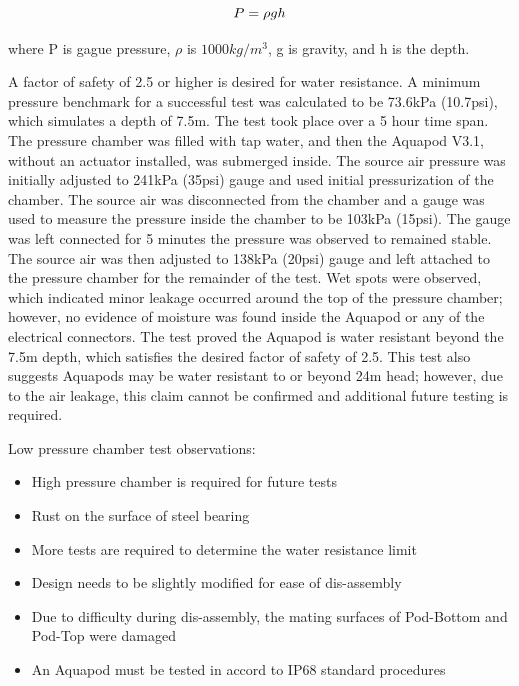 \begin{equation}\label{eq:head}
    P = \rho g h \\
\end{equation}

\noindent where P is gague pressure, $\rho$ is $1000 kg/m^3$, g is gravity, and h is the depth.

A factor of safety of 2.5 or higher is desired for water resistance. A minimum pressure benchmark for a successful test was calculated to be 73.6kPa (10.7psi), which simulates a depth of 7.5m.
The test took place over a 5 hour time span.
The pressure chamber was filled with tap water, and then the Aquapod V3.1, without an actuator installed, was submerged inside.
The source air pressure was initially adjusted to 241kPa (35psi) gauge and used initial pressurization of the chamber.
The source air was disconnected from the chamber and a gauge was used to measure the pressure inside the chamber to be 103kPa (15psi). 
The gauge was left connected for 5 minutes the pressure was observed to remained stable. 
The source air was then adjusted to 138kPa (20psi) gauge and left attached to the pressure chamber for the remainder of the test. 
Wet spots were observed, which indicated minor leakage occurred around the top of the pressure chamber; however, no evidence of moisture was found inside the Aquapod or any of the electrical connectors.
The test proved the Aquapod is water resistant beyond the 7.5m depth, which satisfies the desired factor of safety of 2.5.
This test also suggests Aquapods may be water resistant to or beyond 24m head; however, due to the air leakage, this claim cannot be confirmed and additional future testing is required.

Low pressure chamber test observations:
\begin{itemize}
    \item High pressure chamber is required for future tests
    
    \item Rust on the surface of steel bearing 
    
    \item More tests are required to determine the water resistance limit

    \item Design needs to be slightly modified for ease of dis-assembly

    \item Due to difficulty during dis-assembly, the mating surfaces of Pod-Bottom and Pod-Top were damaged
    
    \item An Aquapod must be tested in accord to IP68 standard procedures 
    
\end{itemize}

